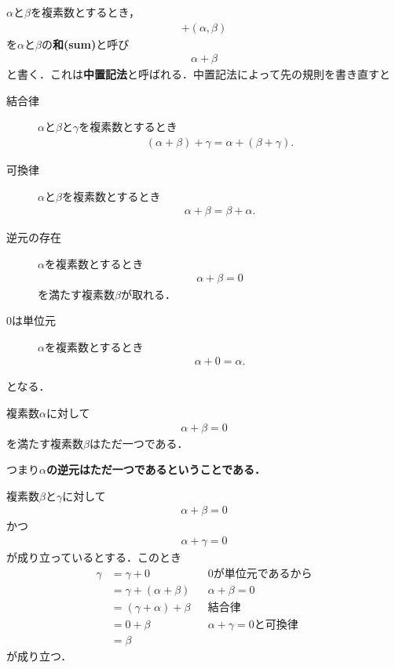 	$\alpha$と$\beta$を複素数とするとき，
	\begin{align}
		+(\alpha,\beta)
	\end{align}
	を$\alpha$と$\beta$の{\bf 和}{\bf (sum)}と呼び
	\begin{align}
		\alpha + \beta
	\end{align}
	と書く．これは{\bf 中置記法}と呼ばれる．中置記法によって先の規則を書き直すと
	\begin{description}
			\item[結合律] $\alpha$と$\beta$と$\gamma$を複素数とするとき
				\begin{align}
					(\alpha+\beta)+\gamma = \alpha+(\beta+\gamma).
				\end{align}
				
			\item[可換律]  $\alpha$と$\beta$を複素数とするとき
				\begin{align}
					\alpha + \beta = \beta + \alpha.
				\end{align}
				
			\item[逆元の存在] $\alpha$を複素数とするとき
				\begin{align}
					\alpha + \beta = 0
				\end{align}
				を満たす複素数$\beta$が取れる．
				
			\item[$0$は単位元] $\alpha$を複素数とするとき
				\begin{align}
					\alpha + 0 = \alpha.
				\end{align}
	\end{description}
	となる．
	
	\begin{screen}
		\begin{thm}[加法に関する逆元はただ一つ]
			複素数$\alpha$に対して
			\begin{align}
				\alpha + \beta = 0
			\end{align}
			を満たす複素数$\beta$はただ一つである．
		\end{thm}
	\end{screen}
	
	つまり{\bf $\alpha$の逆元はただ一つであるということである．}
	
	\begin{sketch}
		複素数$\beta$と$\gamma$に対して
		\begin{align}
			\alpha + \beta = 0
		\end{align}
		かつ
		\begin{align}
			\alpha + \gamma = 0
		\end{align}
		が成り立っているとする．このとき
		\begin{align}
			\gamma &= \gamma + 0 &&\mbox{$0$が単位元であるから} \\
			&= \gamma + (\alpha + \beta) &&\mbox{$\alpha + \beta = 0$} \\
			&= (\gamma + \alpha) + \beta &&\mbox{結合律} \\
			&= 0 + \beta &&\mbox{$\alpha + \gamma = 0$と可換律} \\
			&= \beta
		\end{align}
		が成り立つ．
		\QED
	\end{sketch}
	
